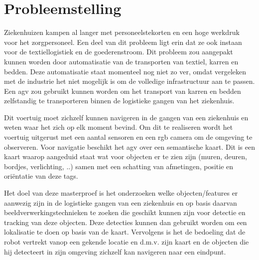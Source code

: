
\chapter{Probleemstelling}

Ziekenhuizen kampen al langer met personeelstekorten en een hoge werkdruk voor het zorgpersoneel. Een deel van dit probleem ligt erin dat ze ook instaan voor de textiellogistiek en de goederenstroom.
Dit probleem zou aangepakt kunnen worden door automatisatie van de transporten van textiel, karren en bedden. Deze automatisatie staat momenteel nog niet zo ver, omdat vergeleken met de industrie het niet mogelijk is om de volledige
infrastructuur aan te passen. Een \gls{agv} zou gebruikt kunnen worden om het transport van karren en bedden zelfstandig te transporteren binnen de logistieke gangen van het ziekenhuis.

Dit voertuig moet zichzelf kunnen navigeren in de gangen van een ziekenhuis en weten waar het zich op elk moment bevind. Om dit te realiseren 
wordt het voertuig uitgerust met een aantal sensoren en een \gls{rgb} camera om de omgeving te observeren. Voor navigatie beschikt het \gls{agv}
over een semantische kaart. Dit is een kaart waarop aangeduid staat wat voor objecten er te zien zijn (muren, deuren, bordjes, verlichting, ..) samen met een schatting van afmetingen, positie en ori\"{e}ntatie van deze tags.


Het doel van deze masterproef is het onderzoeken welke objecten/features er aanwezig zijn in de logistieke gangen van een ziekenhuis en op basis daarvan
beeldverwerkingstechnieken te zoeken die geschikt kunnen zijn voor detectie en tracking van deze objecten. Deze detecties kunnen dan gebruikt worden om een lokalisatie te doen op basis van de kaart.
Vervolgens is het de bedoeling dat de robot vertrekt vanop een gekende locatie en d.m.v. zijn kaart en de objecten die hij detecteert in zijn omgeving zichzelf kan navigeren naar een eindpunt.